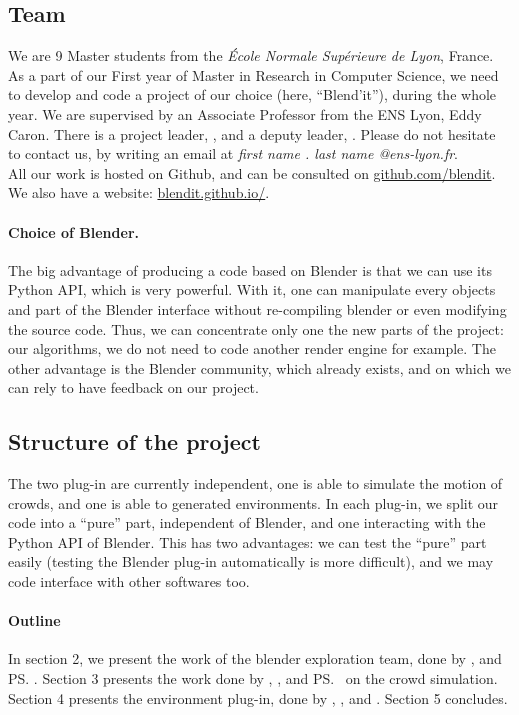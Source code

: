 \subsection{Team}

We are 9 Master students from the \textit{École Normale Supérieure de
Lyon}, France. As a part of our First year of Master in Research in
Computer Science, we need to develop and code a project of our choice
(here, ``Blend'it''), during the whole year. We are supervised by an
Associate Professor from the ENS Lyon, Eddy Caron. There is a project
leader, \me, and a deputy leader, \mr. Please do not hesitate to
contact us, by writing an email at \textit{first name . last name
@ens-lyon.fr}.\\

All our work is hosted on Github, and can be consulted on
\url{github.com/blendit}. We also have a website:
\url{blendit.github.io/}.


\paragraph{Choice of Blender.}

The big advantage of producing a code based on Blender is that we can
use its Python API, which is very powerful. With it, one can
manipulate every objects and part of the Blender interface without
re-compiling blender or even modifying the source code. Thus, we can
concentrate only one the new parts of the project: our algorithms, we
do not need to code another render engine for example.  The other
advantage is the Blender community, which already exists, and on which
we can rely to have feedback on our project.


\subsection{Structure of the project}

The two plug-in are currently independent, one is able to simulate the
motion of crowds, and one is able to generated environments. In each
plug-in, we split our code into a ``pure'' part, independent of
Blender, and one interacting with the Python API of Blender. This has
two advantages: we can test the ``pure'' part easily (testing the
Blender plug-in automatically is more difficult), and we may code
interface with other softwares too.



\paragraph{Outline}

In section 2, we present the work of the blender exploration team,
done by \mr, \me and \ps. Section 3 presents the work done by \dl, \vl,
\js and \ps \ on the crowd simulation. Section 4 presents the environment
plug-in, done by \bb, \gc, \mr and \me. Section 5 concludes.